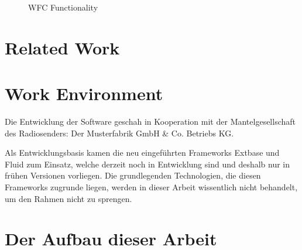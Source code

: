 \begin{figure}[htbp]
  \centering
  
  \caption{WFC Functionality}
\end{figure}


\section{Related Work}
\label{sec:RelatedWork}

\section{Work Environment}
\label{sec:Work Environment}

Die Entwicklung der Software geschah in Kooperation mit der Mantelgesellschaft des Radiosenders: Der Musterfabrik GmbH \& Co. Betriebs KG.

Als Entwicklungsbasis kamen die neu eingef\"uhrten Frameworks Extbase und Fluid zum Einsatz, welche derzeit noch in Entwicklung sind und deshalb nur in fr\"uhen Versionen vorliegen. Die grundlegenden Technologien, die diesen Frameworks zugrunde liegen, werden in dieser Arbeit wissentlich nicht behandelt, um den Rahmen nicht zu sprengen.


\section{Der Aufbau dieser Arbeit}
\label{sec:AufbauDieserArbeit}

